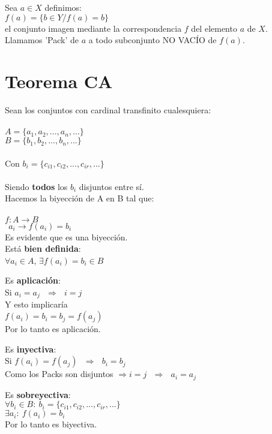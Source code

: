 \noindent 
Sea $a \in X$ definimos:\\
$f(a) = \{ b \in Y / f(a) = b \}$\\ 
el conjunto imagen mediante la correspondencia $f$ del elemento $a$ de $X$.\\

\noindent 
Llamamos 'Pack' de $a$ a todo subconjunto NO VACÍO de $f(a)$.

\newpage
\section{Teorema CA}
 
Sean los conjuntos con cardinal transfinito cualesquiera:\\\\
$A = \{ a_{1}, a_{2}, ... , a_{n}, ... \}$\\
$B = \{ b_{1}, b_{2}, ... , b_{n}, ... \}$\\\\
Con $b_{i} = \{ c_{i1}, c_{i2}, ..., c_{ir}, ... \}$ \\\\
Siendo \textbf{todos} los $b_{i}$ disjuntos entre sí.\\

Hacemos la biyección de A en B tal que:\\\\
$f: A \rightarrow B$\\
$\:\:a_{i} \rightarrow f(a_{i})=b_{i}$\\

Es evidente que es una biyección.\\

Está \textbf{bien definida}:\\
$\forall a_{i} \in A$,  $\exists f(a_{i}) = b_{i} \in B$

Es \textbf{aplicación}:\\
Si $a_{i}=a_{j} \:\:\:\Rightarrow\:\:\: i=j$\\
Y esto implicaría\\
$f(a_{i}) = b_{i} = b_{j} = f(a_{j})$\\
Por lo tanto es aplicación.

Es \textbf{inyectiva}:\\
Si $f(a_{i}) = f(a_{j}) \:\:\:\Rightarrow\:\:\: b_{i}=b_{j}$\\
Como los Packs son disjuntos $\Rightarrow i=j \:\:\:\Rightarrow\:\:\:a_{i}=a_{j}$

Es \textbf{sobreyectiva}:\\
$\forall b_{i} \in B: \: b_{i} = \{c_{i1}, c_{i2}, ... , c_{ir}, ... \}$\\
$\exists a_{i}: \: f(a_{i}) = b_{i}$\\
Por lo tanto es biyectiva.

